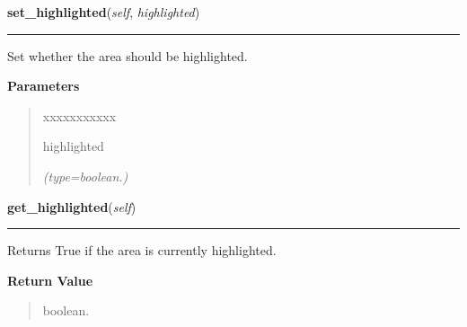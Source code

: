     \label{pygtk_chart:chart:Area:set_highlighted}

    \vspace{0.5ex}

\hspace{.8\funcindent}\begin{boxedminipage}{\funcwidth}

    \raggedright \textbf{set\_highlighted}(\textit{self}, \textit{highlighted})

    \vspace{-1.5ex}

    \rule{\textwidth}{0.5\fboxrule}
\setlength{\parskip}{2ex}
    Set whether the area should be highlighted.

\setlength{\parskip}{1ex}
      \textbf{Parameters}
      \vspace{-1ex}

      \begin{quote}
        \begin{Ventry}{xxxxxxxxxxx}

          \item[highlighted]

            {\it (type=boolean.)}

        \end{Ventry}

      \end{quote}

    \end{boxedminipage}

    \label{pygtk_chart:chart:Area:get_highlighted}

    \vspace{0.5ex}

\hspace{.8\funcindent}\begin{boxedminipage}{\funcwidth}

    \raggedright \textbf{get\_highlighted}(\textit{self})

    \vspace{-1.5ex}

    \rule{\textwidth}{0.5\fboxrule}
\setlength{\parskip}{2ex}
    Returns True if the area is currently highlighted.

\setlength{\parskip}{1ex}
      \textbf{Return Value}
    \vspace{-1ex}

      \begin{quote}
      boolean.

      \end{quote}

    \end{boxedminipage}


